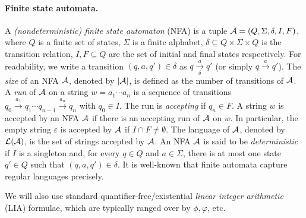 \paragraph*{Finite state automata.} 
A \emph{(nondeterministic) finite state automaton} (NFA)  is a tuple $\mathcal{A}=(Q, \Sigma, \delta, I, F)$, where $Q$ is a finite set of states, $\Sigma$ is a finite alphabet, $\delta \subseteq Q \times \Sigma \times Q$ is the transition relation, $I,F \subseteq Q$ are the set of initial and final states respectively. For readability, we write a transition $(q, a, q') \in \delta$ as $q \xrightarrow[\delta]{a} q'$ (or simply $q \xrightarrow{a} q'$). %
The \emph{size} of an NFA $\mathcal{A}$, denoted by $|\mathcal{A}|$, is defined as the number of transitions of $\mathcal{A}$.
%
A \emph{run} of $\mathcal{A}$ on a string $w = a_1 \cdots a_n$ is a sequence of transitions $q_0 \xrightarrow{a_1} q_1 \cdots q_{n-1} \xrightarrow{a_n} q_n$ with $q_0 \in I$. The run is \emph{accepting} if $q_n \in F$.
A string $w$ is accepted by an NFA $\mathcal{A}$ if there is an accepting run of $\mathcal{A}$ on $w$. In particular, the empty string $\varepsilon$ is accepted by $\mathcal{A}$ if $I \cap F \neq \emptyset$. The language of $\mathcal{A}$, denoted by $\mathcal{L}(\mathcal{A})$, is the set of strings accepted by $\mathcal{A}$. 
%
An NFA $\mathcal{A}$ is said to be \emph{deterministic} if $I$ is a singleton and, for every $q \in Q$ and $a \in \Sigma$, there is at most one state $q' \in Q$ such that $(q, a, q') \in \delta$.
%
It is well-known that finite automata capture regular languages precisely. 





We will also use standard  quantifier-free/existential \emph{linear integer arithmetic} (LIA) formulae, which are typically ranged over by $\phi, \varphi$, etc. %


